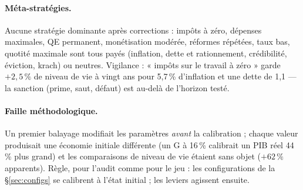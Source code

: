 \documentclass[11pt,a4paper]{article}
\begin{document}
\paragraph{Méta-stratégies.} Aucune stratégie dominante après corrections : impôts à zéro, dépenses maximales, QE permanent, monétisation modérée, réformes répétées, taux bas, quotité maximale sont tous payés (inflation, dette et rationnement, crédibilité, éviction, krach) ou neutres. Vigilance : « impôts sur le travail à zéro » garde $+2{,}5\,\%$ de niveau de vie à vingt ans pour 5,7\,\% d'inflation et une dette de 1,1 — la sanction (prime, saut, défaut) est au-delà de l'horizon testé.

\paragraph{Faille méthodologique.} Un premier balayage modifiait les paramètres \emph{avant} la calibration ; chaque valeur produisait une économie initiale différente (un G à 16\,\% calibrait un PIB réel 44\,\% plus grand) et les comparaisons de niveau de vie étaient sans objet ($+62\,\%$ apparents). Règle, pour l'audit comme pour le jeu : les configurations de la \S\ref{sec:configs} se calibrent à l'état initial ; les leviers agissent ensuite.
\end{document}
